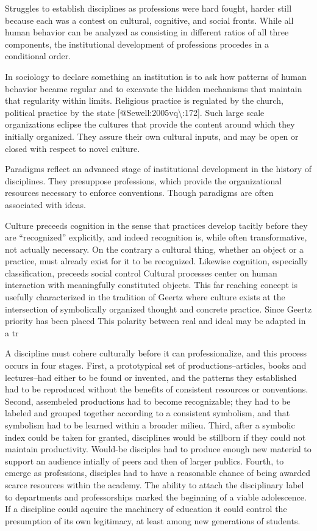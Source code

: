 \documentclass[]{article}
\begin{document}
Struggles to establish disciplines as professions were hard fought,
harder still because each was a contest on cultural, cognitive, and
social fronts. While all human behavior can be analyzed as consisting in
different ratios of all three components, the institutional development
of professions procedes in a conditional order.

In sociology to declare something an institution is to ask how patterns
of human behavior became regular and to excavate the hidden mechanisms
that maintain that regularity within limits. Religious practice is
regulated by the church, political practice by the state
{[}@Sewell:2005vq\textbackslash{}:172{]}. Such large scale organizations
eclipse the cultures that provide the content around which they
initially organized. They assure their own cultural inputs, and may be
open or closed with respect to novel culture.

Paradigms reflect an advanced stage of institutional development in the
history of disciplines. They presuppose professions, which provide the
organizational resources necessary to enforce conventions. Though
paradigms are often associated with ideas.

Culture preceeds cognition in the sense that practices develop tacitly
before they are ``recognized'' explicitly, and indeed recognition is,
while often transformative, not actually necessary. On the contrary a
cultural thing, whether an object or a practice, must already exist for
it to be recognized. Likewise cognition, especially classification,
preceeds social control Cultural processes center on human interaction
with meaningfully constituted objects. This far reaching concept is
usefully characterized in the tradition of Geertz where culture exists
at the intersection of symbolically organized thought and concrete
practice. Since Geertz priority has been placed This polarity between
real and ideal may be adapted in a tr

A discipline must cohere culturally before it can professionalize, and
this process occurs in four stages. First, a prototypical set of
productions--articles, books and lectures--had either to be found or
invented, and the patterns they established had to be reproduced without
the benefits of consistent resources or conventions. Second, assembeled
productions had to become recognizable; they had to be labeled and
grouped together according to a consistent symbolism, and that symbolism
had to be learned within a broader milieu. Third, after a symbolic index
could be taken for granted, disciplines would be stillborn if they could
not maintain productivity. Would-be disciples had to produce enough new
material to support an audience intially of peers and then of larger
publics. Fourth, to emerge as professions, disciples had to have a
reasonable chance of being awarded scarce resources within the academy.
The ability to attach the disciplinary label to departments and
professorships marked the beginning of a viable adolescence. If a
discipline could aqcuire the machinery of education it could control the
presumption of its own legitimacy, at least among new generations of
students.
\end{document}

